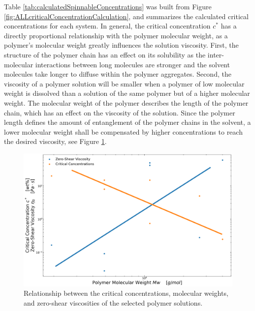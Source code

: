 Table \ref{tab:calculatedSpinnableConcentrations} was built from Figure \ref{fig:ALLcriticalConcentrationCalculation}, and summarizes the calculated critical concentrations for each system. In general, the critical concentration $c^*$ has a directly proportional relationship with the polymer molecular weight, as a polymer's molecular weight greatly influences the solution viscosity. First, the structure of the polymer chain has an effect on its solubility as the inter-molecular interactions between long molecules are stronger and the solvent molecules take longer to diffuse within the polymer aggregates. \cite{Ramakrishna2005, Floreshernandez2020} Second, the viscosity of a polymer solution will be smaller when a polymer of low molecular weight is dissolved than a solution of the same polymer but of a higher molecular weight. \cite{Ramakrishna2005} The molecular weight of the polymer describes the length of the polymer chain, which has an effect on the viscosity of the solution. Since the polymer length defines the amount of entanglement of the polymer chains in the solvent, a lower molecular weight shall be compensated by higher concentrations to reach the desired viscosity, see Figure \ref{fig:criticalConcentrationViscoAndMolWeight}.

\begin{figure}[!th]
\centering
\includegraphics[width=\textwidth]{./Figures/criticalConcentrationViscoAndMolWeight.png}
\decoRule
\caption{Relationship between the critical concentrations, molecular weights, and zero-shear viscosities of the selected polymer solutions.}
\label{fig:criticalConcentrationViscoAndMolWeight}
\end{figure}